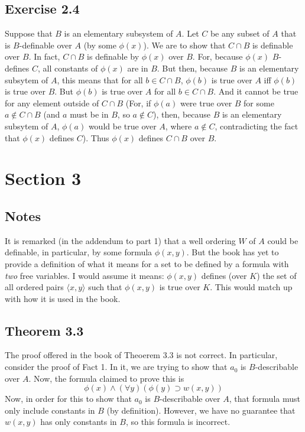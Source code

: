 \documentclass{article}
\theoremstyle{definition}
\begin{document}
\subsection*{Exercise 2.4}
Suppose that $B$ is an elementary subsystem of $A$. Let $C$ be any subset of $A$ that is 
$B$-definable over $A$ (by some $\phi(x)$). We are to show that $C\cap B$ is definable over $B$. In fact, 
$C\cap B$ is definable by $\phi(x)$ over $B$. For, because $\phi(x)$ $B$-defines $C$, 
all constants of $\phi(x)$ are in $B$. But then, because $B$ is an elementary subsytem of 
$A$, this means that for all $b\in C\cap B$, $\phi(b)$ is true over $A$ iff 
$\phi(b)$ is true over $B$. But $\phi(b)$ is true over $A$ for all 
$b\in C\cap B$. And it cannot be true for any element outside of $C\cap B$ (For, if 
$\phi(a)$ were true over $B$ for some $a\notin C\cap B$ (and $a$ must be in $B$, so 
$a\notin C$), then, because $B$ is an 
elementary subsytem of $A$, $\phi(a)$ would be true over $A$, where $a\notin C$, contradicting the fact that 
$\phi(x)$ defines $C$). Thus $\phi(x)$ defines $C\cap B$ over $B$.

\section*{Section 3}

\subsection*{Notes}
It is remarked (in the addendum to part 1) that a well ordering $W$ of $A$ could be 
definable, in particular, by some formula $\phi(x,y)$. But the book has yet to 
provide a definition of what it means for a set to be defined by 
a formula with \textit{two} free variables. I would assume it means: 
$\phi(x,y)$ defines (over $K$) the set of all ordered pairs $\langle x,y\rangle$ such that 
$\phi(x,y)$ is true over $K$. This would match up with how it is used in the book.

\subsection*{Theorem 3.3}
The proof offered in the book of Theoerem 3.3 is not correct. In particular, consider the proof of Fact 1. In it, we are trying to 
show that $a_0$ is $B$-describable over $A$. Now, the formula claimed to prove this is
\[ \phi(x)\wedge (\forall y)(\phi(y)\supset w(x,y)) \] Now, in order for this to show that $a_0$ is $B$-describable over 
$A$, that formula must only include constants in $B$ (by definition). However, we have no guarantee that 
$w(x,y)$ has only constants in $B$, so this formula is incorrect.
\end{document}
